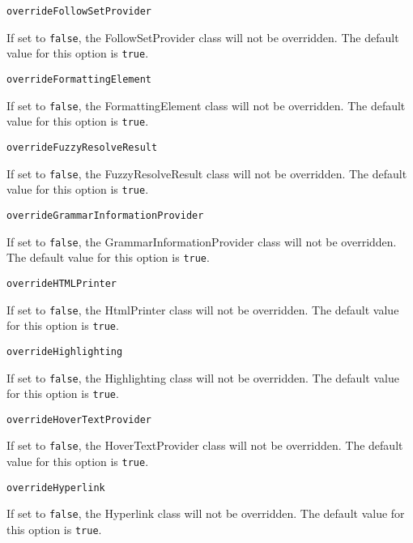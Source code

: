 \noindent\texttt{overrideFollowSetProvider}
\begin{myindentpar}{1cm}
If set to \texttt{false}, the FollowSetProvider class will not be overridden. The default value for this option is \texttt{true}.
\end{myindentpar}

\noindent\texttt{overrideFormattingElement}
\begin{myindentpar}{1cm}
If set to \texttt{false}, the FormattingElement class will not be overridden. The default value for this option is \texttt{true}.
\end{myindentpar}

\noindent\texttt{overrideFuzzyResolveResult}
\begin{myindentpar}{1cm}
If set to \texttt{false}, the FuzzyResolveResult class will not be overridden. The default value for this option is \texttt{true}.
\end{myindentpar}

\noindent\texttt{overrideGrammarInformationProvider}
\begin{myindentpar}{1cm}
If set to \texttt{false}, the GrammarInformationProvider class will not be overridden. The default value for this option is \texttt{true}.
\end{myindentpar}

\noindent\texttt{overrideHTMLPrinter}
\begin{myindentpar}{1cm}
If set to \texttt{false}, the HtmlPrinter class will not be overridden. The default value for this option is \texttt{true}.
\end{myindentpar}

\noindent\texttt{overrideHighlighting}
\begin{myindentpar}{1cm}
If set to \texttt{false}, the Highlighting class will not be overridden. The default value for this option is \texttt{true}.
\end{myindentpar}

\noindent\texttt{overrideHoverTextProvider}
\begin{myindentpar}{1cm}
If set to \texttt{false}, the HoverTextProvider class will not be overridden. The default value for this option is \texttt{true}.
\end{myindentpar}

\noindent\texttt{overrideHyperlink}
\begin{myindentpar}{1cm}
If set to \texttt{false}, the Hyperlink class will not be overridden. The default value for this option is \texttt{true}.
\end{myindentpar}

